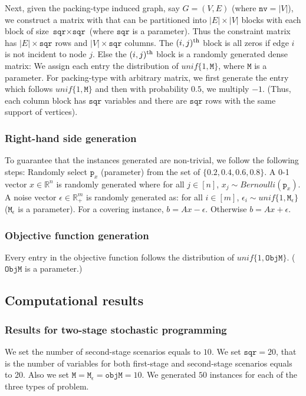 \documentclass[smallextended]{svjour3}
\begin{document}
Next, given the packing-type induced graph, say $G= (V,E)$ (where $\texttt{nv} = |V|$), we construct a matrix with
that can be partitioned into $|E| \times |V|$ blocks with each block of size $\texttt{sqr} \times \texttt{sqr}$ (where $\texttt{sqr}$ is a parameter). Thus the constraint matrix has $|E| \times  \texttt{sqr}$ rows and $|V|\times \texttt{sqr}$ columns. The $(i,j)^{\textup{th}}$ block is all zeros if edge $i$ is not incident to node $j$. Else the $(i,j)^{\textup{th}}$ block is a randomly generated dense matrix: We assign each entry the distribution of $unif\{1, \texttt{M}\}$, where $\texttt{M}$ is a parameter. For packing-type with arbitrary matrix, we first generate the entry which follows $unif\{1, \texttt{M}\}$ and then with probability $0.5$, we multiply $-1$. (Thus, each column block has $\texttt{sqr}$ variables and there are $\texttt{sqr}$ rows with the same support of vertices).

\subsubsection{Right-hand side generation}
To guarantee that the instances generated are non-trivial, we follow the following steps: Randomly select $\texttt{p}_x$ (parameter) from the set of $\{0.2, 0.4,0.6,0.8\}$. A 0-1 vector $x\in {\mathbb{R}}^n$ is randomly generated where for all $j \in [n]$, $x_j \sim Bernoulli(\texttt{p}_x)$. A noise vector $\epsilon \in {\mathbb{R}}^m_{+}$ is randomly generated as: for all $i \in [m]$, $\epsilon_i \sim unif\{1, \texttt{M}_{\epsilon}\}$ ($\texttt{M}_{\epsilon}$ is a parameter). For a covering instance, $b = Ax - \epsilon$. Otherwise $b = Ax + \epsilon$.

\subsubsection{Objective function generation}

Every entry in the objective function follows the distribution of $unif\{1, \texttt{ObjM}\}$. ($\texttt{ObjM}$ is a parameter.)

\subsection{Computational results}\label{sec:CompRes}
\subsubsection{Results for two-stage stochastic programming}
We set the number of second-stage scenarios equals to $10$. We set $\texttt{sqr} = 20$, that is the number of variables for both first-stage and second-stage scenarios equals to 20. Also we set $\texttt{M} =\texttt{M}_{\epsilon} = \texttt{objM} = 10$. We generated $50$ instances for each of the three types of problem.
\end{document}
